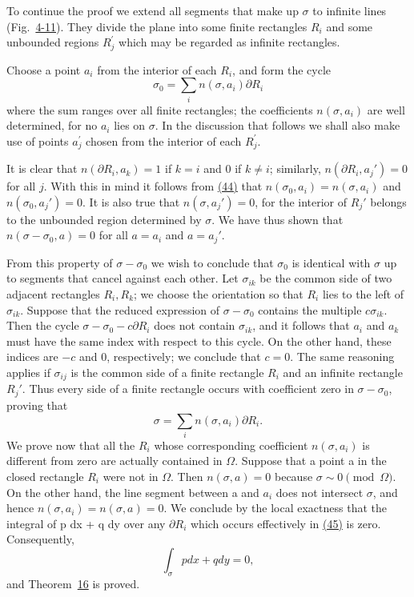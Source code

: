 To continue the proof we extend all segments that make up $\sigma$ to infinite lines (Fig.~\hyperref[fig:4-11]{4-11}). They divide the plane into some finite rectangles $R_{i}$ and some unbounded regions $R_{j}^{\prime}$ which may be regarded as infinite rectangles.

Choose a point $a_{i}$ from the interior of each $R_{i}$, and form the cycle
\begin{equation*}
\sigma_ {0} = \sum_ {i} n (\sigma , a _ {i}) \partial R _ {i}\tag{44}\label{eq:4.44}
\end{equation*}
where the sum ranges over all finite rectangles; the coefficients $n(\sigma, a_{i})$ are well determined, for no $a_{i}$ lies on $\sigma$. In the discussion that follows we shall also make use of points $a_{j}^{\prime}$ chosen from the interior of each $R_{j}^{\prime}$.

It is clear that $n(\partial R_i, a_k) = 1$ if $k = i$ and $0$ if $k \neq i$; similarly, $n(\partial R_i, a_j') = 0$ for all $j$. With this in mind it follows from \hyperref[eq:4.44]{(44)} that $n(\sigma_0, a_i) = n(\sigma, a_i)$ and $n(\sigma_0, a_j') = 0$. It is also true that $n(\sigma, a_j') = 0$, for
the interior of $R_j'$ belongs to the unbounded region determined by $\sigma$. We have thus shown that $n(\sigma - \sigma_0, a) = 0$ for all $a = a_i$ and $a = a_j'$.

From this property of $\sigma - \sigma_0$ we wish to conclude that $\sigma_0$ is identical with $\sigma$ up to segments that cancel against each other. Let $\sigma_{ik}$ be the common side of two adjacent rectangles $R_i, R_k$; we choose the orientation so that $R_i$ lies to the left of $\sigma_{ik}$. Suppose that the reduced expression of $\sigma - \sigma_0$ contains the multiple $c\sigma_{ik}$. Then the cycle $\sigma - \sigma_0 - c \partial R_i$ does not contain $\sigma_{ik}$, and it follows that $a_i$ and $a_k$ must have the same index with respect to this cycle. On the other hand, these indices are $-c$ and 0, respectively; we conclude that $c = 0$. The same reasoning applies if $\sigma_{ij}$ is the common side of a finite rectangle $R_i$ and an infinite rectangle $R_j'$. Thus every side of a finite rectangle occurs with coefficient zero in $\sigma - \sigma_0$, proving that
\begin{equation*}
\sigma = \sum_ {i} n (\sigma , a _ {i}) \partial R _ {i}.\tag{45}\label{eq:4.45}
\end{equation*}
We prove now that all the $R_{i}$ whose corresponding coefficient $n(\sigma, a_{i})$ is different from zero are actually contained in $\Omega$. Suppose that a point a in the closed rectangle $R_{i}$ were not in $\Omega$. Then $n(\sigma, a) = 0$ because $\sigma \sim 0 \pmod{\Omega}$. On the other hand, the line segment between a and $a_{i}$ does not intersect $\sigma$, and hence $n(\sigma, a_{i}) = n(\sigma, a) = 0$. We conclude by the local exactness that the integral of p dx + q dy over any $\partial R_{i}$ which occurs effectively in \hyperref[eq:4.45]{(45)} is zero. Consequently,
\begin{equation*}
\int_ {\sigma} p d x + q d y = 0,
\end{equation*}
and Theorem~\hyperref[thm:4.16]{16} is proved.

